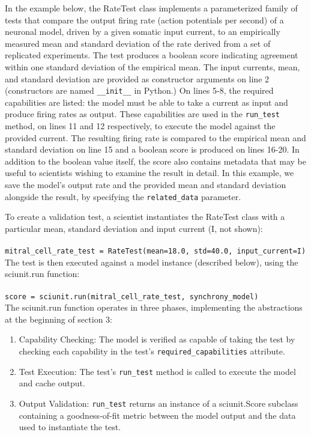 \documentclass[11pt,letterpaper]{article}
\begin{document}
In the example below, the RateTest class implements a parameterized family of tests that compare the output firing rate (action potentials per second) of a neuronal model, driven by a given somatic input current, to an empirically measured mean and standard deviation of the rate derived from a set of replicated experiments. The test produces a boolean score indicating agreement within one standard deviation of the empirical mean. The input currents, mean, and standard deviation are provided as constructor arguments on line 2 (constructors are named \verb|__init__| in Python.) On lines 5-8, the required capabilities are listed: the model must be able to take a current as input and produce firing rates as output. These capabilities are used in the \verb|run_test| method, on lines 11 and 12 respectively, to execute the model against the provided current. The resulting firing rate is compared to the empirical mean and standard deviation on line 15 and a boolean score is produced on lines 16-20. In addition to the boolean value itself, the score also contains metadata that may be useful to scientists wishing to examine the result in detail. In this example, we save the model's output rate and the provided mean and standard deviation alongside the result, by specifying the \verb|related_data| parameter.

To create a validation test, a scientist instantiates the RateTest class with a particular mean, standard deviation and input current (I, not shown):
\\
\\
\verb|mitral_cell_rate_test = RateTest(mean=18.0, std=40.0, input_current=I)|
\\

The test is then executed against a model instance (described below), using the sciunit.run function:
\\
\\
\verb|score = sciunit.run(mitral_cell_rate_test, synchrony_model)|
\\

The sciunit.run function operates in three phases, implementing the abstractions at the beginning of section 3:
\begin{enumerate}
\item Capability Checking: The model is verified as capable of taking the test by checking each capability in the test's \verb|required_capabilities| attribute.
\item Test Execution: The test's \verb|run_test| method is called to execute the model and cache output.
\item Output Validation: \verb|run_test| returns an instance of a sciunit.Score subclass containing a goodness-of-fit metric between the model output and the data used to instantiate the test.
\end{enumerate}
\end{document}
